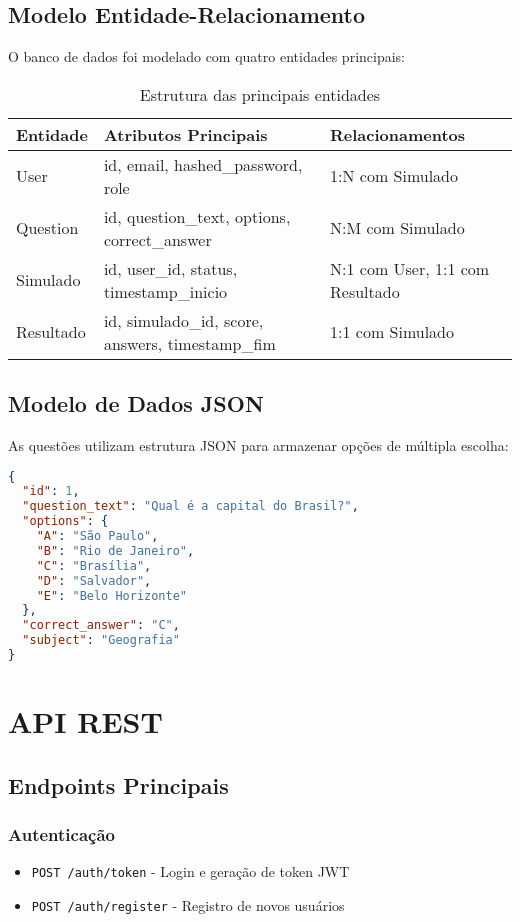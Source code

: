 \documentclass[12pt,a4paper]{article}
\begin{document}
\subsection{Modelo Entidade-Relacionamento}

O banco de dados foi modelado com quatro entidades principais:

\begin{table}[H]
\centering
\begin{tabular}{|l|l|l|}
\hline
\textbf{Entidade} & \textbf{Atributos Principais} & \textbf{Relacionamentos} \\
\hline
User & id, email, hashed\_password, role & 1:N com Simulado \\
\hline
Question & id, question\_text, options, correct\_answer & N:M com Simulado \\
\hline
Simulado & id, user\_id, status, timestamp\_inicio & N:1 com User, 1:1 com Resultado \\
\hline
Resultado & id, simulado\_id, score, answers, timestamp\_fim & 1:1 com Simulado \\
\hline
\end{tabular}
\caption{Estrutura das principais entidades}
\end{table}

\subsection{Modelo de Dados JSON}
As questões utilizam estrutura JSON para armazenar opções de múltipla escolha:

\begin{lstlisting}[language=json, caption=Estrutura de uma questão]
{
  "id": 1,
  "question_text": "Qual é a capital do Brasil?",
  "options": {
    "A": "São Paulo",
    "B": "Rio de Janeiro", 
    "C": "Brasília",
    "D": "Salvador",
    "E": "Belo Horizonte"
  },
  "correct_answer": "C",
  "subject": "Geografia"
}
\end{lstlisting}

\section{API REST}

\subsection{Endpoints Principais}

\subsubsection{Autenticação}
\begin{itemize}
    \item \texttt{POST /auth/token} - Login e geração de token JWT
    \item \texttt{POST /auth/register} - Registro de novos usuários
\end{itemize}
\end{document}
